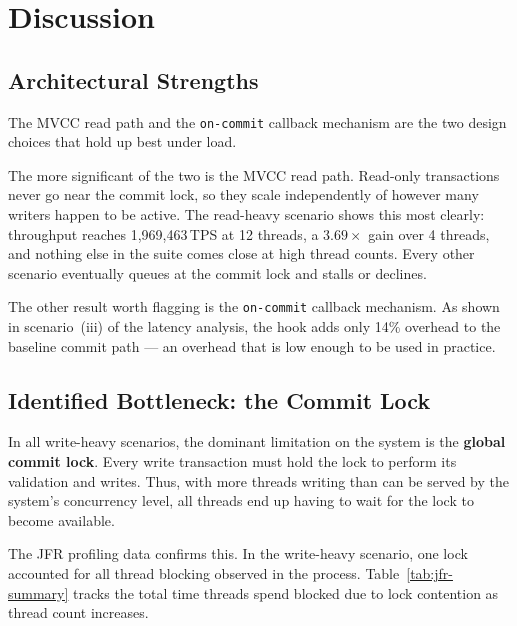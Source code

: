 \section{Discussion}

\subsection{Architectural Strengths}

The MVCC read path and the \texttt{on-commit} callback mechanism are
the two design choices that hold up best under load.

The more significant of the two is the MVCC read path. Read-only
transactions never go near the commit lock, so they scale independently
of however many writers happen to be active. The read-heavy scenario
shows this most clearly: throughput reaches 1,969,463\,TPS at 12
threads, a $3.69\times$ gain over 4 threads, and nothing else in the
suite comes close at high thread counts. Every other scenario
eventually queues at the commit lock and stalls or declines.

The other result worth flagging is the \texttt{on-commit} callback
mechanism. As shown in scenario~(iii) of the latency analysis, the hook
adds only 14\% overhead to the baseline commit path --- an overhead that
is low enough to be used in practice.

\subsection{Identified Bottleneck: the Commit Lock}
\label{sec:bottlenecks}

In all write-heavy scenarios, the dominant limitation on the system is
the \textbf{global commit lock}. Every write transaction must hold the
lock to perform its validation and writes. Thus, with more threads
writing than can be served by the system's concurrency level, all
threads end up having to wait for the lock to become available.

The JFR profiling data confirms this. In the write-heavy scenario, one
lock accounted for all thread blocking observed in the process.
Table~\ref{tab:jfr-summary} tracks the total time threads spend blocked
due to lock contention as thread count increases.

